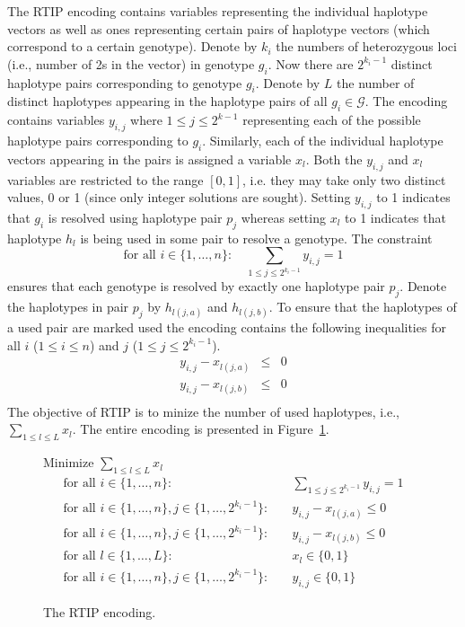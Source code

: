 \documentclass[12pt,a4paper]{article}
\begin{document}
The RTIP encoding contains variables representing the individual haplotype vectors as well as ones representing certain pairs of haplotype vectors (which correspond to a certain genotype).
Denote by $k_i$ the numbers of heterozygous loci (i.e., number of 2s in the vector) in genotype $g_i$.
Now there are $2^{k_i-1}$ distinct haplotype pairs corresponding to genotype $g_i$.
Denote by $L$ the number of distinct haplotypes appearing in the haplotype pairs of all $g_i\in\mathcal{G}$.
The encoding contains variables $y_{i,j}$ where $1\leq j \leq 2^{k-1}$ representing each of the possible haplotype pairs corresponding to $g_i$.
Similarly, each of the individual haplotype vectors appearing in the pairs is assigned a variable $x_l$.
Both the $y_{i,j}$ and $x_l$ variables are restricted to the range $[0,1]$, i.e. they may take only two distinct values, 0 or 1 (since only integer solutions are sought).
Setting $y_{i,j}$ to 1 indicates that $g_i$ is resolved using haplotype pair $p_j$ whereas 
setting $x_l$ to 1 indicates that haplotype $h_l$ is being used in some pair to resolve a genotype.
The constraint
$$ \text{for all  }i\in\{1,\dots , n\}:\quad \sum_{1\leq j \leq 2^{k_i-1}} y_{i,j} = 1 $$
ensures that each genotype is resolved by exactly one haplotype pair $p_j$.
Denote the haplotypes in pair $p_j$ by $h_{l(j,a)}$ and $h_{l(j,b)}$.
To ensure that the haplotypes of a used pair are marked used the encoding contains the following inequalities for all $i$ ($1\leq i \leq n$) and $j$ ($1\leq j \leq 2^{k_i-1}$).
\begin{eqnarray*}
y_{i,j} - x_{l(j,a)} & \leq & 0 \\
y_{i,j} - x_{l(j,b)} & \leq & 0 \\
\end{eqnarray*}
The objective of RTIP is to minize the number of used haplotypes, i.e., $\sum_{1\leq l \leq L} x_l$.
The entire encoding is presented in Figure~\ref{fig:enc-rtip}.

\begin{figure}
\centering
Minimize $\sum_{1\leq l \leq L} x_l$
\begin{align}
\text{for all  }i\in\{1,\dots , n\}:&\quad \sum_{1\leq j \leq 2^{k_i-1}} y_{i,j} = 1 \\
\text{for all  }i\in\{1,\dots , n\}, j\in\{1,\dots , 2^{k_i-1}\}:& \quad y_{i,j} - x_{l(j,a)}  \leq  0 \\
\text{for all  }i\in\{1,\dots , n\}, j\in\{1,\dots , 2^{k_i-1}\}:&\quad y_{i,j} - x_{l(j,b)}  \leq  0 \\
\text{for all  }l\in\{1,\dots , L\}:&\quad x_l \in \{0,1\} \\
\text{for all  }i\in\{1,\dots , n\}, j\in\{1,\dots , 2^{k_i-1}\}:&\quad y_{i,j} \in \{0,1\} 
\end{align}
\caption{The RTIP encoding.}
\label{fig:enc-rtip}
\end{figure}
\end{document}
